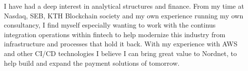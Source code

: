 \documentclass[../../main.tex]{subfiles}
\begin{document}
I have had a deep interest in analytical structures and finance. From my time at Nasdaq, SEB, KTH Blockchain society and my own experience running my own consultancy, I find myself especially wanting to work with the continus integration operations within fintech to help modernize this industry from infrastructure and processes that hold it back. With my experience with AWS and other CI/CD technologies I believe I can bring great value to Nordnet, to help build and expand the payment solutions of tomorrow.
\\
\end{document}
